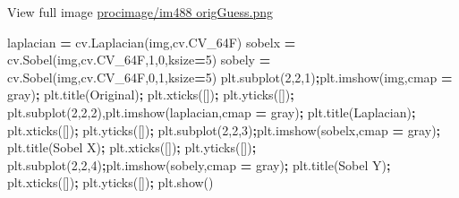 \documentclass[
]{article}
\newenvironment{Shaded}{\begin{snugshade}}{\end{snugshade}}
\newcommand{\DecValTok}[1]{\textcolor[rgb]{0.00,0.00,0.81}{#1}}
\newcommand{\NormalTok}[1]{#1}
\newcommand{\OperatorTok}[1]{\textcolor[rgb]{0.81,0.36,0.00}{\textbf{#1}}}
\newcommand{\StringTok}[1]{\textcolor[rgb]{0.31,0.60,0.02}{#1}}
\begin{document}
View full image \href{procimage/im488\%20origGuess.png}{procimage/im488
origGuess.png}

\begin{Shaded}
\begin{Highlighting}[]


\NormalTok{laplacian }\OperatorTok{=}\NormalTok{ cv.Laplacian(img,cv.CV\_64F)}
\NormalTok{sobelx }\OperatorTok{=}\NormalTok{ cv.Sobel(img,cv.CV\_64F,}\DecValTok{1}\NormalTok{,}\DecValTok{0}\NormalTok{,ksize}\OperatorTok{=}\DecValTok{5}\NormalTok{)}
\NormalTok{sobely }\OperatorTok{=}\NormalTok{ cv.Sobel(img,cv.CV\_64F,}\DecValTok{0}\NormalTok{,}\DecValTok{1}\NormalTok{,ksize}\OperatorTok{=}\DecValTok{5}\NormalTok{)}
\NormalTok{plt.subplot(}\DecValTok{2}\NormalTok{,}\DecValTok{2}\NormalTok{,}\DecValTok{1}\NormalTok{)}\OperatorTok{;}\NormalTok{plt.imshow(img,cmap }\OperatorTok{=} \StringTok{\textquotesingle{}gray\textquotesingle{}}\NormalTok{)}\OperatorTok{;}
\NormalTok{plt.title(}\StringTok{\textquotesingle{}Original\textquotesingle{}}\NormalTok{)}\OperatorTok{;}\NormalTok{ plt.xticks([])}\OperatorTok{;}\NormalTok{ plt.yticks([])}\OperatorTok{;}
\NormalTok{plt.subplot(}\DecValTok{2}\NormalTok{,}\DecValTok{2}\NormalTok{,}\DecValTok{2}\NormalTok{),plt.imshow(laplacian,cmap }\OperatorTok{=} \StringTok{\textquotesingle{}gray\textquotesingle{}}\NormalTok{)}\OperatorTok{;}
\NormalTok{plt.title(}\StringTok{\textquotesingle{}Laplacian\textquotesingle{}}\NormalTok{)}\OperatorTok{;}\NormalTok{ plt.xticks([])}\OperatorTok{;}\NormalTok{ plt.yticks([])}\OperatorTok{;}
\NormalTok{plt.subplot(}\DecValTok{2}\NormalTok{,}\DecValTok{2}\NormalTok{,}\DecValTok{3}\NormalTok{)}\OperatorTok{;}\NormalTok{plt.imshow(sobelx,cmap }\OperatorTok{=} \StringTok{\textquotesingle{}gray\textquotesingle{}}\NormalTok{)}\OperatorTok{;}
\NormalTok{plt.title(}\StringTok{\textquotesingle{}Sobel X\textquotesingle{}}\NormalTok{)}\OperatorTok{;}\NormalTok{ plt.xticks([])}\OperatorTok{;}\NormalTok{ plt.yticks([])}\OperatorTok{;}
\NormalTok{plt.subplot(}\DecValTok{2}\NormalTok{,}\DecValTok{2}\NormalTok{,}\DecValTok{4}\NormalTok{)}\OperatorTok{;}\NormalTok{plt.imshow(sobely,cmap }\OperatorTok{=} \StringTok{\textquotesingle{}gray\textquotesingle{}}\NormalTok{)}\OperatorTok{;}
\NormalTok{plt.title(}\StringTok{\textquotesingle{}Sobel Y\textquotesingle{}}\NormalTok{)}\OperatorTok{;}\NormalTok{ plt.xticks([])}\OperatorTok{;}\NormalTok{ plt.yticks([])}\OperatorTok{;}
\NormalTok{plt.show()}
\end{Highlighting}
\end{Shaded}
\end{document}
